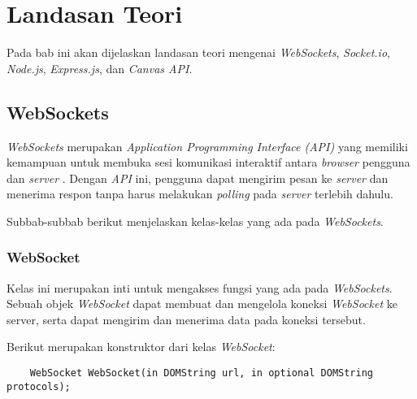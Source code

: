 \chapter{Landasan Teori}
\label{chap:teori}

Pada bab ini akan dijelaskan landasan teori mengenai \textit{WebSockets}, \textit{Socket.io}, \textit{Node.js}, \textit{Express.js}, dan \textit{Canvas API}.

\section{WebSockets}
\label{sec:WebSockets} 

\textit{WebSockets} merupakan \textit{Application Programming Interface (API)} yang memiliki kemampuan untuk membuka sesi komunikasi interaktif antara \textit{browser} pengguna dan \textit{server} \cite{websockets}. Dengan \textit{API} ini, pengguna dapat mengirim pesan ke \textit{server} dan menerima respon tanpa harus melakukan \textit{polling} pada \textit{server} terlebih dahulu.

Subbab-subbab berikut menjelaskan kelas-kelas yang ada pada \textit{WebSockets}.

\subsection{WebSocket}
Kelas ini merupakan inti untuk mengakses fungsi yang ada pada \textit{WebSockets}. Sebuah objek \textit{WebSocket} dapat membuat dan mengelola koneksi \textit{WebSocket} ke server, serta dapat mengirim dan menerima data pada koneksi tersebut. 


Berikut merupakan konstruktor dari kelas \textit{WebSocket}: 
\begin{lstlisting}
	WebSocket WebSocket(in DOMString url, in optional DOMString protocols);
\end{lstlisting}

